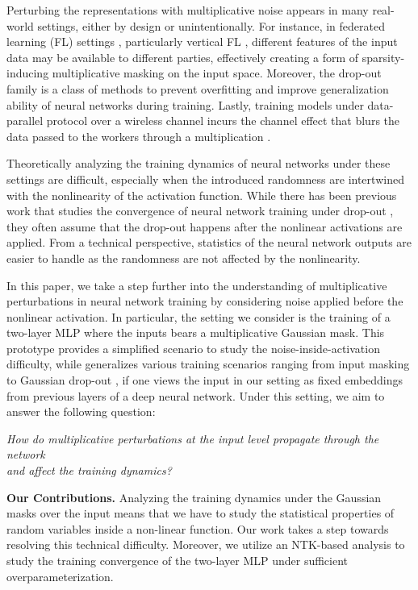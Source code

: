 \documentclass[10pt]{article} %
\theoremstyle{definition}
\theoremstyle{plain}
\begin{document}
Perturbing the representations with multiplicative noise appears in many real-world settings, either by design or unintentionally. For instance, in federated learning (FL) settings \citep{mcmahan2017communication, kairouz2021advances}, particularly vertical FL \citep{cheng2020federated, liu2021fate, romanini2021pyvertical, he2020fedml, liu2022fedbcd, liu2024vertical}, different features of the input data may be available to different parties, effectively creating a form of sparsity-inducing multiplicative masking on the input space. Moreover, the drop-out family \citep{srivastava2014dropout,rey2021gaussian} is a class of methods to prevent overfitting and improve generalization ability of neural networks during training. Lastly, training models under data-parallel protocol over a wireless channel incurs the channel effect that blurs the data passed to the workers through a multiplication \cite{TseViswanath2005}. 

Theoretically analyzing the training dynamics of neural networks under these settings are difficult, especially when the introduced randomness are intertwined with the nonlinearity of the activation function. While there has been previous work that studies the convergence of neural network training under drop-out \citep{liao2022convergence,mianjy2020convergence}, they often assume that the drop-out happens after the nonlinear activations are applied. From a technical perspective, statistics of the neural network outputs are easier to handle as the randomness are not affected by the nonlinearity. 


In this paper, we take a step further into the understanding of multiplicative perturbations in neural network training by considering noise applied before the nonlinear activation. In particular, the setting we consider is the training of a two-layer MLP where the inputs bears a multiplicative Gaussian mask. This prototype provides a simplified scenario to study the noise-inside-activation difficulty, while generalizes various training scenarios ranging from input masking \citep{kariotakis2024leveraging} to Gaussian drop-out \citep{rey2021gaussian}, if one views the input in our setting as fixed embeddings from previous layers of a deep neural network. Under this setting, we aim to answer the following question:
\begin{center}
    \textit{How do multiplicative perturbations at the input level propagate through the network\\ and affect the training dynamics?} 
\end{center}
\textbf{Our Contributions.}
Analyzing the training dynamics under the Gaussian masks over the input means that we have to study the statistical properties of random variables inside a non-linear function. 
Our work takes a step towards resolving this technical difficulty. Moreover, we utilize an NTK-based analysis \citep{du2018gradient,song2020quadraticsufficesoverparametrizationmatrix,oymak2019moderateoverparameterizationglobalconvergence,liao2022convergence} to study the training convergence of the two-layer MLP under sufficient overparameterization.
\end{document}
